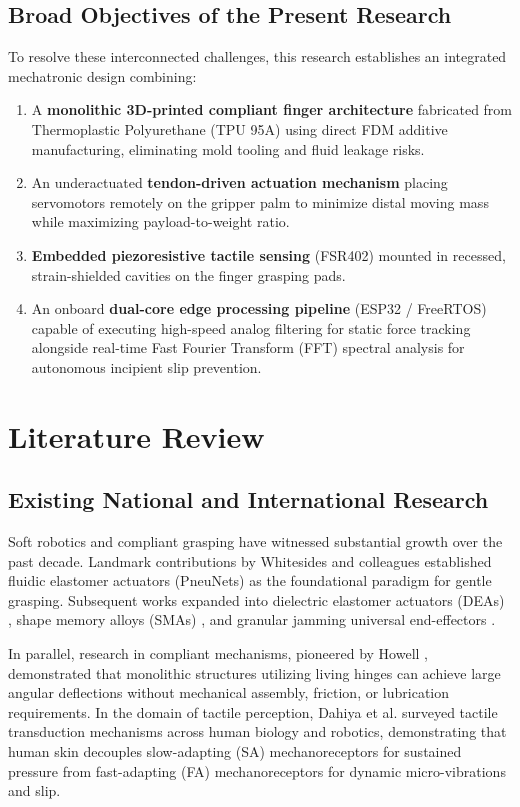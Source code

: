\documentclass[12pt,a4paper]{report}
\begin{document}
\section{Broad Objectives of the Present Research}
To resolve these interconnected challenges, this research establishes an integrated mechatronic design combining:
\begin{enumerate}
    \item A \textbf{monolithic 3D-printed compliant finger architecture} fabricated from Thermoplastic Polyurethane (TPU 95A) using direct FDM additive manufacturing, eliminating mold tooling and fluid leakage risks.
    \item An underactuated \textbf{tendon-driven actuation mechanism} placing servomotors remotely on the gripper palm to minimize distal moving mass while maximizing payload-to-weight ratio.
    \item \textbf{Embedded piezoresistive tactile sensing} (FSR402) mounted in recessed, strain-shielded cavities on the finger grasping pads.
    \item An onboard \textbf{dual-core edge processing pipeline} (ESP32 / FreeRTOS) capable of executing high-speed analog filtering for static force tracking alongside real-time Fast Fourier Transform (FFT) spectral analysis for autonomous incipient slip prevention.
\end{enumerate}

\chapter{Literature Review}

\section{Existing National and International Research}
Soft robotics and compliant grasping have witnessed substantial growth over the past decade. Landmark contributions by Whitesides and colleagues \cite{whitesides2018soft, mosadegh2014pneumatic} established fluidic elastomer actuators (PneuNets) as the foundational paradigm for gentle grasping. Subsequent works expanded into dielectric elastomer actuators (DEAs) \cite{shintake2018soft}, shape memory alloys (SMAs) \cite{polygerinos2017soft}, and granular jamming universal end-effectors \cite{rus2015design}. 

In parallel, research in compliant mechanisms, pioneered by Howell \cite{howell2001compliant}, demonstrated that monolithic structures utilizing living hinges can achieve large angular deflections without mechanical assembly, friction, or lubrication requirements. In the domain of tactile perception, Dahiya et al. \cite{dahiya2010tactile} surveyed tactile transduction mechanisms across human biology and robotics, demonstrating that human skin decouples slow-adapting (SA) mechanoreceptors for sustained pressure from fast-adapting (FA) mechanoreceptors for dynamic micro-vibrations and slip.
\end{document}
